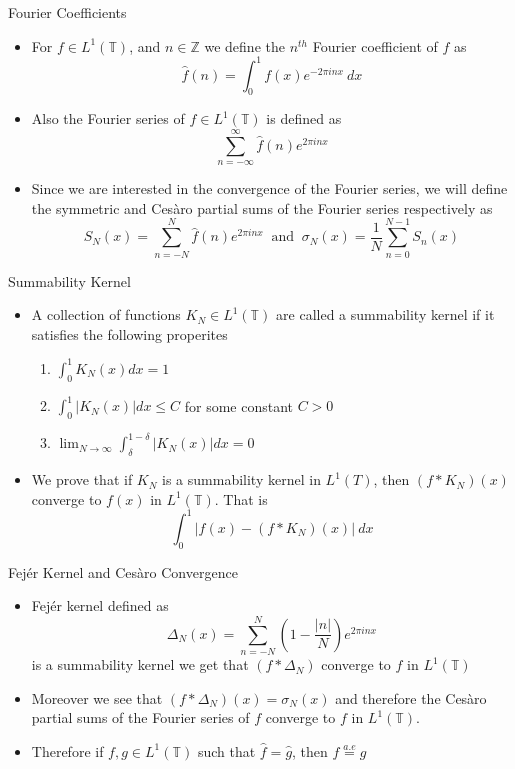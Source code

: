 \documentclass[compress]{beamer}
\newcommand{\Z}{\mathbb Z}
\newcommand{\T}{\mathbb T}
\begin{document}
\begin{frame}{Fourier Coefficients}
  \begin{itemize}
    \item For $f \in L^1(\T)$, and $n \in \Z$ we define the $n^{th}$ Fourier coefficient of $f$ as $$\hat{f}(n) = \int_0^1 f(x)e^{-2\pi i n x} \ dx $$
    \item Also the Fourier series of $f \in L^1(\T)$ is defined as $$\sum_{n=-\infty }^\infty \hat{f}(n) e^{2\pi in x} $$
    \item Since we are interested in the convergence of the Fourier series, we will define the symmetric and Ces\`aro partial sums of the Fourier series respectively as $$ S_N(x) = \sum_{n=-N}^N \hat{f}(n)e^{2\pi inx} \ \text{ and } \  \sigma_N(x) = \frac{1}{N}\sum_{n=0}^{N-1} S_n(x)$$
   \end{itemize}
\end{frame}

\begin{frame}{Summability Kernel}
  \begin{itemize}
    \item A collection of functions $K_N \in L^1(\T)$ are called a summability kernel if it satisfies the following properites
      \begin{enumerate}
        \item $\int_{0}^{1}K_N(x)dx = 1$
        \item $\int_{0}^{1}\lvert K_N(x)\rvert dx \le C$ for some constant $C>0$
        \item $\lim_{N\to\infty} \int_{\delta}^{1-\delta}\lvert K_N(x)\rvert dx= 0$
      \end{enumerate}
    \item We prove that if $K_N$ is a summability kernel in $L^1(T)$, then $(f*K_N)(x)$ converge to $f(x)$ in $L^1(\T)$. That is $$\int_0^1 \lvert f(x) - (f*K_N)(x) \rvert \ dx$$
  \end{itemize}
\end{frame}

\begin{frame}{Fej\'er Kernel and Ces\`aro Convergence}
  \begin{itemize}
    \item Fej\'er kernel defined as $$\Delta_N(x) = \sum_{n=-N}^N\left(1 - \frac{|n|}{N} \right)e^{2\pi inx}$$
      is a summability kernel we get that $(f*\Delta_N)$ converge to $f$ in $L^1(\T)$
    \item Moreover we see that $(f*\Delta_N)(x) = \sigma_N(x)$ and therefore the Ces\`aro partial sums of the Fourier series of $f$ converge to $f$ in $L^1(\T)$.
    \item Therefore if $f, g \in L^1(\T)$ such that $\hat{f} = \hat{g}$, then $f \stackrel{a.e}{=} g$
  \end{itemize}
\end{frame}
\end{document}
